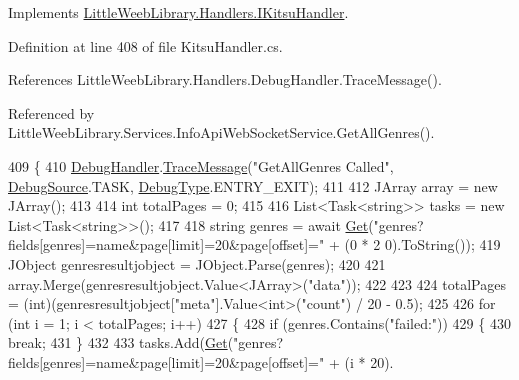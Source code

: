 Implements \mbox{\hyperlink{interface_little_weeb_library_1_1_handlers_1_1_i_kitsu_handler_ad5d0744af17b926aed44fe87e6834f04}{Little\+Weeb\+Library.\+Handlers.\+I\+Kitsu\+Handler}}.



Definition at line 408 of file Kitsu\+Handler.\+cs.



References Little\+Weeb\+Library.\+Handlers.\+Debug\+Handler.\+Trace\+Message().



Referenced by Little\+Weeb\+Library.\+Services.\+Info\+Api\+Web\+Socket\+Service.\+Get\+All\+Genres().


\begin{DoxyCode}
409         \{
410             \mbox{\hyperlink{class_little_weeb_library_1_1_handlers_1_1_kitsu_handler_a6d3c55fa5eee15320845c2d902c96882}{DebugHandler}}.\mbox{\hyperlink{interface_little_weeb_library_1_1_handlers_1_1_i_debug_handler_a2e405bc3492e683cd3702fae125221bc}{TraceMessage}}(\textcolor{stringliteral}{"GetAllGenres Called"}, 
      \mbox{\hyperlink{namespace_little_weeb_library_1_1_handlers_a2a6ca0775121c9c503d58aa254d292be}{DebugSource}}.TASK, \mbox{\hyperlink{namespace_little_weeb_library_1_1_handlers_ab66019ed40462876ec4e61bb3ccb0a62}{DebugType}}.ENTRY\_EXIT);
411 
412             JArray array = \textcolor{keyword}{new} JArray();
413 
414             \textcolor{keywordtype}{int} totalPages = 0;
415 
416             List<Task<string>> tasks = \textcolor{keyword}{new} List<Task<string>>();
417 
418             \textcolor{keywordtype}{string} genres = await \mbox{\hyperlink{class_little_weeb_library_1_1_handlers_1_1_kitsu_handler_a8b7c629a03096c3152252f6b5cf2937f}{Get}}(\textcolor{stringliteral}{"genres?fields[genres]=name&page[limit]=20&page[offset]="} + (0 * 2
      0).ToString());
419             JObject genresresultjobject = JObject.Parse(genres);
420 
421             array.Merge(genresresultjobject.Value<JArray>(\textcolor{stringliteral}{"data"}));
422 
423 
424             totalPages = (int)(genresresultjobject[\textcolor{stringliteral}{"meta"}].Value<int>(\textcolor{stringliteral}{"count"}) / 20 - 0.5);
425 
426             \textcolor{keywordflow}{for} (\textcolor{keywordtype}{int} i = 1; i < totalPages; i++)
427             \{
428                 \textcolor{keywordflow}{if} (genres.Contains(\textcolor{stringliteral}{"failed:"}))
429                 \{
430                     \textcolor{keywordflow}{break};
431                 \}
432 
433                 tasks.Add(\mbox{\hyperlink{class_little_weeb_library_1_1_handlers_1_1_kitsu_handler_a8b7c629a03096c3152252f6b5cf2937f}{Get}}(\textcolor{stringliteral}{"genres?fields[genres]=name&page[limit]=20&page[offset]="} + (i * 20).

\end{DoxyCode}
